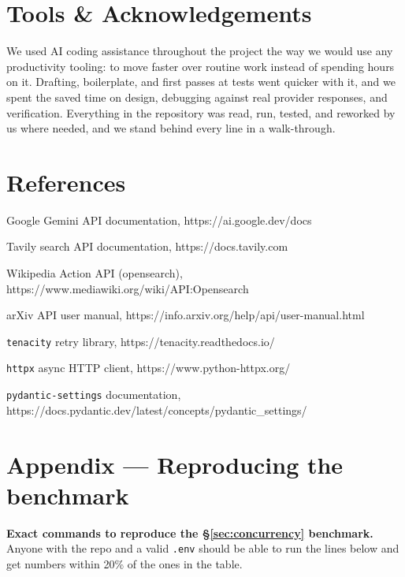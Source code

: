 \documentclass[11pt,a4paper]{article}
\begin{document}
\section{Tools \& Acknowledgements}\label{sec:tools}

We used AI coding assistance throughout the project the way we would use any productivity tooling: to move faster over routine work instead of spending hours on it. Drafting, boilerplate, and first passes at tests went quicker with it, and we spent the saved time on design, debugging against real provider responses, and verification. Everything in the repository was read, run, tested, and reworked by us where needed, and we stand behind every line in a walk-through.

\section*{References}

\begin{enumerate}[label={[\arabic*]},leftmargin=2.4em,itemsep=2pt]
\item Google Gemini API documentation, https://ai.google.dev/docs
\item Tavily search API documentation, https://docs.tavily.com
\item Wikipedia Action API (opensearch), https://www.mediawiki.org/wiki/API:Opensearch
\item arXiv API user manual, https://info.arxiv.org/help/api/user-manual.html
\item \texttt{tenacity} retry library, https://tenacity.readthedocs.io/
\item \texttt{httpx} async HTTP client, https://www.python-httpx.org/
\item \texttt{pydantic-settings} documentation, https://docs.pydantic.dev/latest/concepts/pydantic\_settings/
\end{enumerate}

\appendix
\section{Appendix --- Reproducing the benchmark}
\textbf{Exact commands to reproduce the \S\ref{sec:concurrency} benchmark.} Anyone with the repo and a valid \texttt{.env} should be able to run the lines below and get numbers within 20\% of the ones in the table.
\end{document}
